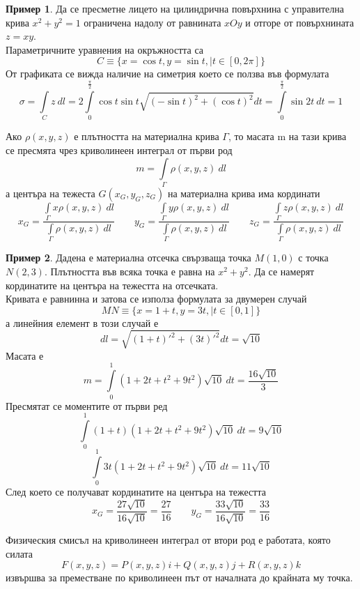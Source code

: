 \documentclass[a4paper,fleqn,12pt]{article}
\theoremstyle{definition}
\newtheorem{example}{Пример}[subsection]
\begin{document}
\begin{example}
Да се пресметне лицето на цилиндрична повърхнина с управителна крива $x^2+y^2=1$ ограничена надолу от равнината $xOy$ и отгоре от повърхнината $z=xy$.\\
Параметричните уравнения на окръжността са
$$C \equiv \{ x = \cos t , y = \sin t, | t \in [0,2\pi]\}$$
От графиката се вижда наличие на симетрия което се ползва във формулата 
$$\sigma = \int\limits_C z \ dl = 2 \int\limits_0 ^{\frac{\pi}{2}} \cos t \sin t \sqrt{(-\sin t)^2 + (\cos t)^2} dt = \int\limits_0 ^{\frac{\pi}{2}} \sin 2t \  dt = 1 $$
\end{example}
Ако $\rho(x,y,z)$ е плътността на материална крива $\Gamma$, то масата m на тази крива се пресмята чрез криволинеен интеграл от първи род
$$m = \int\limits_{\Gamma} \rho(x,y,z) \ dl$$
а центъра на тежеста $G(x_G, y_G, z_G)$ на материална крива има кординати 
$$ x_G = \frac{\int\limits_{\Gamma} x\rho(x,y,z) \ dl}{\int\limits_{\Gamma} \rho(x,y,z) \ dl} \qquad  
y_G = \frac{\int\limits_{\Gamma} y\rho(x,y,z) \ dl}{\int\limits_{\Gamma} \rho(x,y,z) \ dl} \qquad  
z_G = \frac{\int\limits_{\Gamma} z\rho(x,y,z) \ dl}{\int\limits_{\Gamma} \rho(x,y,z) \ dl}$$

\begin{example}
Дадена е материална отсечка свързваща точка $M(1,0)$ с точка $N(2,3)$. Плътността във всяка точка е равна на $x^2+y^2$. Да се намерят кординатите на центъра на тежестта на отсечката. \\
Кривата е равнинна и затова се използа формулата за двумерен случай
$$MN \equiv \{x = 1+t, y=3t, | t \in[0,1] \}$$
а линейния елемент в този случай е 
$$dl = \sqrt{(1+t)'^2 + (3t)'^2} dt = \sqrt{10}$$
Масата е 
$$m = \int\limits_0 ^1 (1+2t+t^2+9t^2)\sqrt{10} \ dt = \frac{16\sqrt{10}}{3}$$
Пресмятат се моментите от първи ред
$$\int\limits_0 ^1 (1+t)(1+2t+t^2+9t^2)\sqrt{10} \ dt  = 9\sqrt{10}$$
$$\int\limits_0 ^1 3t(1+2t+t^2+9t^2)\sqrt{10} \ dt  = 11\sqrt{10}$$
След което се получават кординатите на центъра на тежестта
$$x_G = \frac{27\sqrt{10}}{16\sqrt{10}} = \frac{27}{16} \qquad y_G = \frac{33\sqrt{10}}{16\sqrt{10}} = \frac{33}{16}$$
\end{example}
Физическия смисъл на криволинеен интеграл от втори род е работата, която силата 
$$F(x,y,z) = P(x,y,z)i + Q(x,y,z)j + R(x,y,z) k$$
извършва за преместване по криволинеен път от началната до крайната му точка.
\end{document}
